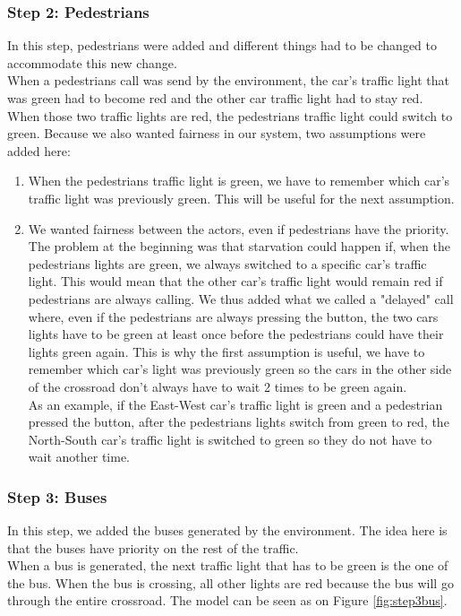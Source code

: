 \subsubsection{Step 2: Pedestrians}
In this step, pedestrians were added and different things had to be changed to accommodate this new change. \\ 

When a pedestrians call was send by the environment, the car's traffic light that was green had to become red and the other car traffic light had to stay red. When those two traffic lights are red, the pedestrians traffic light could switch to green. Because we also wanted fairness in our system, two assumptions were added here:
\begin{enumerate}
    \item When the pedestrians traffic light is green, we have to remember which car's traffic light was previously green. This will be useful for the next assumption.
    \item We wanted fairness between the actors, even if pedestrians have the priority. The problem at the beginning was that starvation could happen if, when the pedestrians lights are green, we always switched to a specific car's traffic light. This would mean that the other car's traffic light would remain red if pedestrians are always calling. We thus added what we called a "delayed" call where, even if the pedestrians are always pressing the button, the two cars lights have to be green at least once before the pedestrians could have their lights green again. This is why the first assumption is useful, we have to remember which car's light was previously green so the cars in the other side of the crossroad don't always have to wait 2 times to be green again. \\
    As an example, if the East-West car's traffic light is green and a pedestrian pressed the button, after the pedestrians lights switch from green to red, the North-South car's traffic light is switched to green so they do not have to wait another time.
\end{enumerate}

\subsubsection{Step 3: Buses}\label{sec:step3}
In this step, we added the buses generated by the environment. The idea here is that the buses have priority on the rest of the traffic. \\
When a bus is generated, the next traffic light that has to be green is the one of the bus. When the bus is crossing, all other lights are red because the bus will go through the entire crossroad. The model can be seen as on Figure \ref{fig:step3bus}. \\

